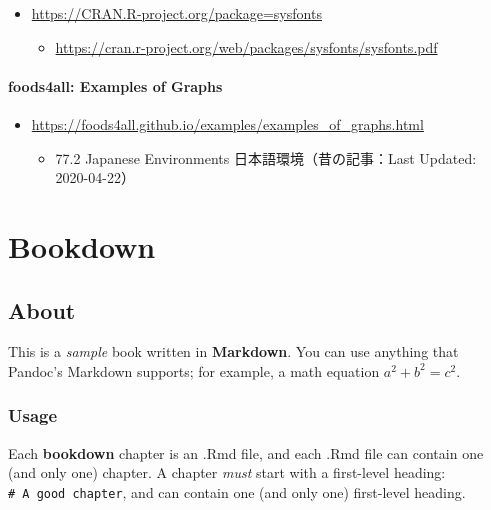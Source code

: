 \documentclass[
]{bxjsbook}
\providecommand{\tightlist}{%
  \setlength{\itemsep}{0pt}\setlength{\parskip}{0pt}}
\theoremstyle{definition}
\theoremstyle{definition}
\theoremstyle{definition}
\theoremstyle{definition}
\theoremstyle{remark}
\begin{document}
\begin{itemize}
\tightlist
\item
  \url{https://CRAN.R-project.org/package=sysfonts}

  \begin{itemize}
  \tightlist
  \item
    \url{https://cran.r-project.org/web/packages/sysfonts/sysfonts.pdf}
  \end{itemize}
\end{itemize}

\hypertarget{foods4all-examples-of-graphs}{%
\paragraph{foods4all: Examples of Graphs}\label{foods4all-examples-of-graphs}}

\begin{itemize}
\tightlist
\item
  \url{https://foods4all.github.io/examples/examples_of_graphs.html}

  \begin{itemize}
  \tightlist
  \item
    77.2 Japanese Environments 日本語環境（昔の記事：Last Updated: 2020-04-22）
  \end{itemize}
\end{itemize}

\hypertarget{bookdown}{%
\section{Bookdown}\label{bookdown}}

\hypertarget{about}{%
\subsection{About}\label{about}}

This is a \emph{sample} book written in \textbf{Markdown}. You can use anything that Pandoc's Markdown supports; for example, a math equation \(a^2 + b^2 = c^2\).

\hypertarget{usage}{%
\subsubsection{Usage}\label{usage}}

Each \textbf{bookdown} chapter is an .Rmd file, and each .Rmd file can contain one (and only one) chapter. A chapter \emph{must} start with a first-level heading: \texttt{\#\ A\ good\ chapter}, and can contain one (and only one) first-level heading.
\end{document}
